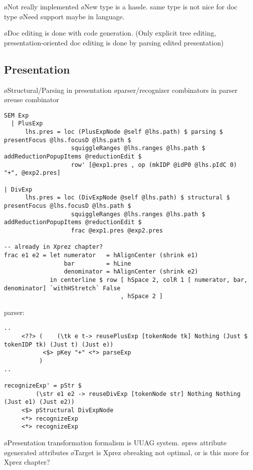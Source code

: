 \bl
\o Not really implemented
\o New type is a hassle. same type is not nice for doc type
\o Need support maybe in language. 
\el

\bl
\o Doc editing is done with code generation. (Only explicit tree editing, presentation-oriented doc editing is done by parsing edited presentation)
\el

\subsection{Presentation}

\bl
\o Structural/Parsing in presentation
\o parser/recognizer combinators in parser
\o reuse combinator
\el


\begin{verbatim}
SEM Exp
  | PlusExp
      lhs.pres = loc (PlusExpNode @self @lhs.path) $ parsing $ presentFocus @lhs.focusD @lhs.path $
                   squiggleRanges @lhs.ranges @lhs.path $ addReductionPopupItems @reductionEdit $
                   row' [@exp1.pres , op (mkIDP @idP0 @lhs.pIdC 0) "+", @exp2.pres]

| DivExp      
      lhs.pres = loc (DivExpNode @self @lhs.path) $ structural $ presentFocus @lhs.focusD @lhs.path $
                   squiggleRanges @lhs.ranges @lhs.path $ addReductionPopupItems @reductionEdit $
                   frac @exp1.pres @exp2.pres

-- already in Xprez chapter?
frac e1 e2 = let numerator   = hAlignCenter (shrink e1)
                 bar         = hLine
                 denominator = hAlignCenter (shrink e2)
             in centerline $ row [ hSpace 2, colR 1 [ numerator, bar, denominator] `withHStretch` False
                                 , hSpace 2 ]
\end{verbatim}

parser:
\begin{verbatim}
..
     <??> (    (\tk e t-> reusePlusExp [tokenNode tk] Nothing (Just $ tokenIDP tk) (Just t) (Just e))
           <$> pKey "+" <*> parseExp 
          )
..

recognizeExp' = pStr $ 
         (\str e1 e2 -> reuseDivExp [tokenNode str] Nothing Nothing (Just e1) (Just e2))
     <$> pStructural DivExpNode
     <*> recognizeExp
     <*> recognizeExp

\end{verbatim}

\bl
\o Presentation transformation formalism is UUAG system.
\o pres attribute
\o generated attributes
\o Target is {\sc Xprez}
\o breaking not optimal, or is this more for Xprez chapter?
\el

